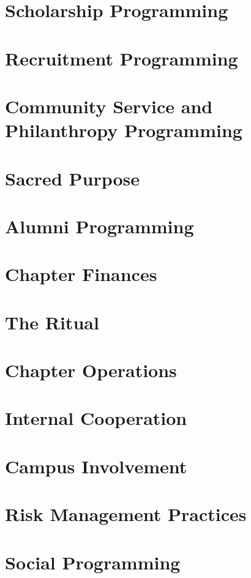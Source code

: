  \section{Scholarship Programming}
    
  \section{Recruitment Programming}
    
  \section{Community Service and Philanthropy Programming}
  
  \section{Sacred Purpose}
    
  \section{Alumni Programming}
  
  \section{Chapter Finances}
  
  \section{The Ritual}
    
  \section{Chapter Operations}
  
  \section{Internal Cooperation}
  
  \section{Campus Involvement}
    
  \section{Risk Management Practices}
    
  \section{Social Programming}
    